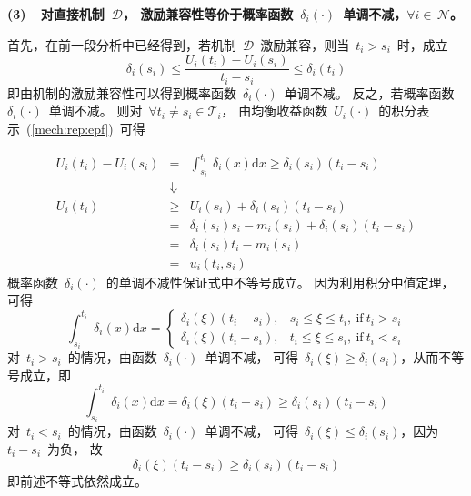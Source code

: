 \documentclass[a4paper,12pt]{article}
\newcommand{\id}{\mathrm{d}}                      %
\begin{document}
\textbf{(3)~~对直接机制~$\mathcal{D}$，
激励兼容性等价于概率函数~$\delta_i(\cdot)$~单调不减，$\forall i\in\,\mathcal{N}$。}\vspace{5pt}

首先，在前一段分析中已经得到，若机制~$\mathcal{D}$~激励兼容，则当~$t_i>s_i$~时，成立
\begin{equation*}
    \delta_i(s_i) \le \frac{U_i(t_i) - U_i(s_i)}{t_i - s_i} \le \delta_i(t_i)
\end{equation*}
即由机制的激励兼容性可以得到概率函数~$\delta_i(\cdot)$~单调不减。
反之，若概率函数~$\delta_i(\cdot)$~单调不减。
则对~$\forall t_i\neq s_i\in\mathcal{T}_i$，
由均衡收益函数~$U_i(\cdot)$~的积分表示~(\ref{mech:rep:epf})~可得

\begin{eqnarray*}
  U_i(t_i) - U_i(s_i) &=& \int_{s_i}^{t_i}~\delta_i(x)\id x
   \ge \delta_i(s_i)(t_i - s_i)\\
   &\Downarrow&\\
  U_i(t_i) &\ge& U_i(s_i) + \delta_i(s_i)(t_i - s_i)\\
     &=& \delta_i(s_i)s_i - m_i(s_i) + \delta_i(s_i)(t_i - s_i)\\
     &=& \delta_i(s_i)t_i - m_i(s_i)\\
     &=& u_i(t_i,s_i)
\end{eqnarray*}
概率函数~$\delta_i(\cdot)$~的单调不减性保证式中不等号成立。
因为利用积分中值定理，可得
\begin{equation*}
    \int_{s_i}^{t_i}~\delta_i(x)\id x = \left\{
        \begin{array}{ll}
          \delta_i(\xi)(t_i - s_i), & s_i\le\xi\le t_i,~\mathrm{if}~t_i > s_i \\
          \delta_i(\xi)(t_i - s_i), & t_i\le\xi\le s_i,~\mathrm{if}~t_i < s_i
        \end{array}
    \right.
\end{equation*}
对~$t_i > s_i$~的情况，由函数~$\delta_i(\cdot)$~单调不减，
可得~$\delta_i(\xi)\ge\delta_i(s_i)$，从而不等号成立，即
\begin{equation*}
    \int_{s_i}^{t_i}~\delta_i(x)\id x = \delta_i(\xi)(t_i - s_i)
                                     \ge \delta_i(s_i)(t_i - s_i)
\end{equation*}
对~$t_i < s_i$~的情况，由函数~$\delta_i(\cdot)$~单调不减，
可得~$\delta_i(\xi)\le\delta_i(s_i)$，因为~$t_i - s_i$~为负，
故
\begin{equation*}
    \delta_i(\xi)(t_i - s_i)\ge\delta_i(s_i)(t_i - s_i)
\end{equation*}
即前述不等式依然成立。\vspace{5pt}
\end{document}
